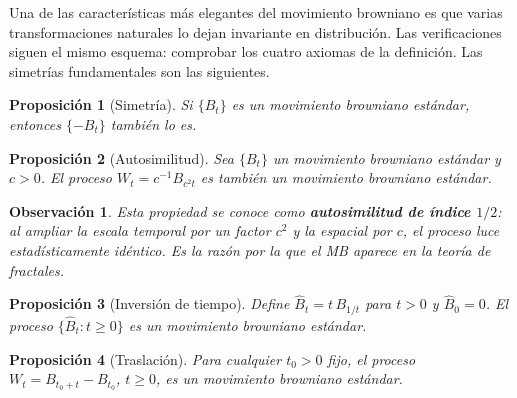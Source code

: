\documentclass[12pt]{book}
\newtheorem{proposition}{Proposición}[chapter]
\newtheorem{remark}{Observación}[chapter]
\begin{document}
Una de las características más elegantes del movimiento browniano es que varias transformaciones naturales lo dejan invariante en distribución. Las verificaciones siguen el mismo esquema: comprobar los cuatro axiomas de la definición. Las simetrías fundamentales son las siguientes.

\begin{proposition}[Simetría]
Si $\{B_t\}$ es un movimiento browniano estándar, entonces $\{-B_t\}$ también lo es.
\end{proposition}

\begin{proposition}[Autosimilitud]
Sea $\{B_t\}$ un movimiento browniano estándar y $c > 0$. El proceso $W_t = c^{-1} B_{c^2 t}$ es también un movimiento browniano estándar.
\end{proposition}

\begin{remark}
Esta propiedad se conoce como \textbf{autosimilitud de índice $1/2$}: al ampliar la escala temporal por un factor $c^2$ y la espacial por $c$, el proceso luce estadísticamente idéntico. Es la razón por la que el MB aparece en la teoría de fractales.
\end{remark}

\begin{proposition}[Inversión de tiempo]
Define $\hat{B}_t = t\, B_{1/t}$ para $t > 0$ y $\hat{B}_0 = 0$. El proceso $\{\hat{B}_t : t \ge 0\}$ es un movimiento browniano estándar.
\end{proposition}

\begin{proposition}[Traslación]
Para cualquier $t_0 > 0$ fijo, el proceso $W_t = B_{t_0 + t} - B_{t_0}$, $t \ge 0$, es un movimiento browniano estándar.
\end{proposition}
\end{document}
